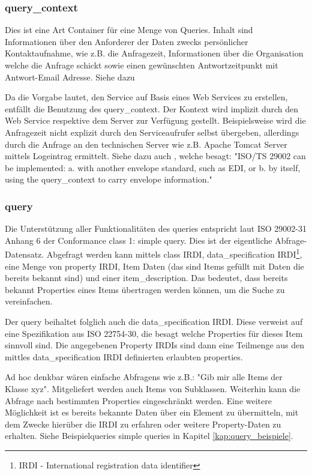 \subsubsection{query\_context}
Dies ist eine Art Container für eine Menge von Queries. Inhalt sind Informationen über den Anforderer der Daten zwecks persönlicher Kontaktaufnahme, wie z.B. die Anfragezeit, Informationen über die Organisation welche die Anfrage schickt sowie einen gewünschten Antwortzeitpunkt mit Antwort-Email Adresse. Siehe dazu \citep[Kap. 5.2.2][]{iso29002-31}

Da die Vorgabe lautet, den Service auf Basis eines Web Services zu erstellen, entfällt die Benutzung des query\_context. Der Kontext wird implizit durch den Web Service respektive dem Server zur Verfügung gestellt. Beispielsweise wird die Anfragezeit nicht explizit durch den Serviceaufrufer selbst übergeben, allerdings durch die Anfrage an den technischen Server wie z.B. Apache Tomcat Server mittels Logeintrag ermittelt. 
Siehe dazu auch \citep[Kap. 6][]{iso29002-31}, welche besagt: "ISO/TS 29002 can be implemented:
a. with another envelope standard, such as EDI, or
b. by itself, using the query\_context to carry envelope information."

\subsubsection{query}
Die Unterstützung aller Funktionalitäten des queries entspricht laut ISO 29002-31 Anhang 6 der Conformance class 1: simple query.
Dies ist der eigentliche Abfrage-Datensatz. Abgefragt werden kann mittels class IRDI, data\_specification IRDI\footnote{IRDI  - International registration data identifier}, eine Menge von property IRDI, Item Daten (das sind Items gefüllt mit Daten die bereits bekannt sind) und einer item\_description. Das bedeutet, dass bereits bekannt Properties eines Items übertragen werden können, um die Suche zu vereinfachen.

Der query beihaltet folglich auch die data\_specification IRDI. Diese verweist auf eine Spezifikation aus ISO 22754-30, die besagt welche Properties für dieses Item sinnvoll sind. Die angegebenen Property IRDIs sind dann eine Teilmenge aus den mittles data\_specification IRDI definierten erlaubten properties. 

Ad hoc denkbar wären einfache Abfragens wie z.B.: "Gib mir alle Items der Klasse xyz". Mitgeliefert werden auch Items von Subklassen. Weiterhin kann die Abfrage nach bestimmten Properties eingeschränkt werden. Eine weitere Möglichkeit ist es bereits bekannte Daten über ein Element zu übermitteln, mit dem Zwecke hierüber die IRDI zu erfahren oder weitere Property-Daten zu erhalten. Siehe Beispielqueries simple queries in Kapitel \ref{kap:query_beispiele}. 

